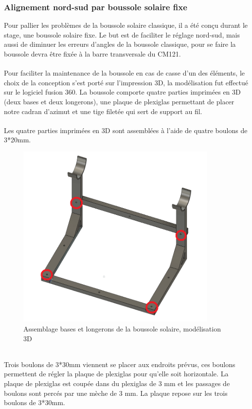 \documentclass[12pt,a4paper]{article}
\begin{document}
\begin{flushleft}
\subsubsection{Alignement nord-sud par boussole solaire fixe}   

Pour pallier les problèmes de la boussole solaire classique, il a été conçu durant le stage, une boussole solaire fixe. Le but est de faciliter le réglage nord-sud, mais aussi de diminuer les erreurs d'angles de la boussole classique, pour se faire la boussole devra être fixée à la barre transversale du CM121.\\
~\\
Pour faciliter la maintenance de la boussole en cas de casse d'un des éléments, le choix de la conception s'est porté sur l'impression 3D, la modélisation fut effectué sur le logiciel fusion 360. La boussole comporte quatre parties imprimées en 3D (deux bases et deux longerons), une plaque de plexiglas permettant de placer notre cadran d'azimut et une tige filetée qui sert de support au fil.\\
~\\
Les quatre parties imprimées en 3D sont assemblées à l'aide de quatre boulons de 3*20mm.\\

\begin{figure}[H]
\centering
\includegraphics[width=10cm]{image/montage/boussole_solaire/2.png} 
\caption{Assemblage bases et longerons de la boussole solaire, modélisation 3D}
\end{figure}
~\\
Trois boulons de 3*30mm viennent se placer aux endroits prévus, ces boulons permettent de régler la plaque de plexiglas pour qu'elle soit horizontale. La plaque de plexiglas est coupée dans du plexiglas de 3 mm et les passages de boulons sont percés par une mèche de 3 mm. La plaque repose sur les trois boulons de 3*30mm.\\


\end{flushleft}
\end{document}
